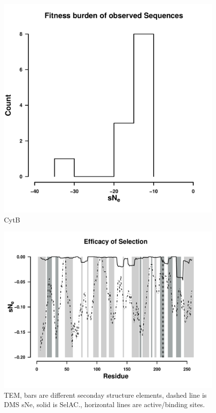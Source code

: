 \documentclass[12pt]{article}
\begin{document}
\begin{figure}[H]
     \centering
	\includegraphics[width=\textwidth]{img/sNe_whale}
	\caption{CytB}
	\label{fig:sne_whale}
\end{figure}


\begin{figure}[H]
     \centering
	\includegraphics[width=\textwidth]{img/sNe_slide_TEM2016}
	\caption{TEM, bars are different seconday structure elements, dashed line is DMS sNe, solid is SelAC., horizontal lines are active/binding sites.}
	\label{fig:sne_tem2016}
\end{figure}
\end{document}
